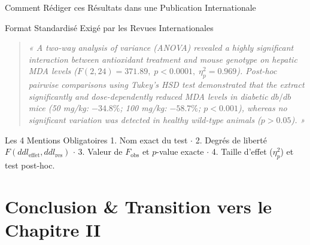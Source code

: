 \documentclass[aspectratio=169,10pt]{beamer}
\begin{document}
\begin{frame}{Comment Rédiger ces Résultats dans une Publication Internationale}
  \begin{conceptbox}{Format Standardisé Exigé par les Revues Internationales}
    \footnotesize
    \begin{quote}
      \textit{« A two-way analysis of variance (ANOVA) revealed a highly significant interaction between antioxidant treatment and mouse genotype on hepatic MDA levels ($F(2, 24) = 371.89, \; p < 0.0001, \; \eta_p^2 = 0.969$). Post-hoc pairwise comparisons using Tukey's HSD test demonstrated that the extract significantly and dose-dependently reduced MDA levels in diabetic $db/db$ mice (50 mg/kg: $-34.8\%$; 100 mg/kg: $-58.7\%$; $p < 0.001$), whereas no significant variation was detected in healthy wild-type animals ($p > 0.05$). »}
    \end{quote}
  \end{conceptbox}
  \vspace{1mm}
  \begin{takeawaybox}{Les 4 Mentions Obligatoires}
    \small
    1. Nom exact du test $\cdot$ 2. Degrés de liberté $F(ddl_{\text{effet}}, ddl_{\text{res}})$ $\cdot$ 3. Valeur de $F_{\text{obs}}$ et $p$-value exacte $\cdot$ 4. Taille d'effet ($\eta_p^2$) et test post-hoc.
  \end{takeawaybox}
\end{frame}

\section{Conclusion \& Transition vers le Chapitre II}
\end{document}
